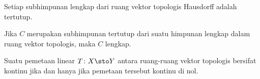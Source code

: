 \begin{prop} Setiap subhimpunan lengkap dari ruang vektor topologis Hausdorff adalah tertutup.
\end{prop}

\begin{prop} Jika $C$ merupakan subhimpunan tertutup dari suatu himpunan lengkap dalam ruang vektor topologis, maka $C$ lengkap.
\end{prop}



\begin{prop} Suatu pemetaan linear $T\colon X \sto Y$ antara ruang-ruang vektor topologis bersifat kontinu jika dan hanya jika pemetaan tersebut kontinu di nol.
\end{prop}



















